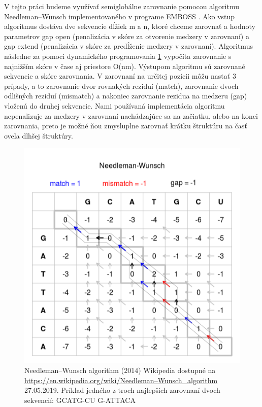 \indent  V tejto práci budeme využívať semiglobálne zarovnanie pomocou algoritmu Needleman–Wunsch \cite{Needleman70}  implementovaného v programe EMBOSS \cite{Emboss}. Ako vstup algoritmus dostáva dve sekvencie dĺžiek m a n, ktoré chceme zarovnať a hodnoty parametrov gap open (penalizácia v skóre za otvorenie medzery v zarovnaní) a gap extend (penalizácia v skóre za predĺženie medzery v zarovnaní). Algoritmus následne za pomoci dynamického programovania \ref{obr03:aln} vypočíta zarovnanie s najnižším skóre v čase aj priestore O(nm).  Výstupom algoritmu sú zarovnané sekvencie a skóre zarovnania. V zarovnaní na určitej pozícii môžu nastať 3 prípady, a to zarovnanie dvor rovnakých reziduí (match), zarovnanie dvoch odlišných reziduí (mismatch) a nakoniec zarovnanie rezidua na medzeru (gap) vloženú do druhej sekvencie. Nami používaná implementácia algoritmu nepenalizuje za medzery v zarovnaní nachádzajúce sa na začiatku, alebo na konci zarovnania, preto je možné ňou zmysluplne zarovnať krátku štruktúru na časť oveľa dlhšej štruktúry.

\begin{figure}%
\includegraphics[width=\textwidth]{../img/needlemanwunsch}
\caption{Needleman–Wunsch algorithm (2014) Wikipedia dostupné na \url{https://en.wikipedia.org/wiki/Needleman–Wunsch\_algorithm} 27.05.2019. Príklad jedného z troch najlepších zarovnaní dvoch sekvencií: \newline GCATG-CU \newline G-ATTACA}
\label{obr03:aln}
\end{figure}



